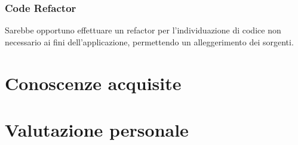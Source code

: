 \subsubsection{Code Refactor}
Sarebbe opportuno effettuare un refactor per l'individuazione di codice non necessario ai fini dell'applicazione, permettendo un alleggerimento dei sorgenti.
\section{Conoscenze acquisite}

\section{Valutazione personale}
